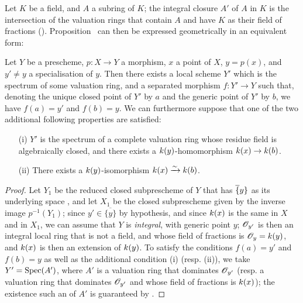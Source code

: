 \begin{env}[7.1.3]
\label{II.7.1.3}
Let $K$ be a field, and $A$ a subring of $K$;
the integral closure $A'$ of $A$ in $K$ is the intersection of the valuation rings that contain $A$ and have $K$ as their field of fractions (\cite[p.~51, th.~2]{I-11}).
Proposition~ can then be expressed geometrically in an equivalent form:
\end{env}

\begin{proposition}[7.1.4]
\label{II.7.1.4}
Let $Y$ be a prescheme, $p:X\to Y$ a morphism, $x$ a point of $X$, $y=p(x)$, and $y'\neq y$ a specialisation  of $y$.
Then there exists a local scheme $Y'$ which is the spectrum of some valuation ring, and a separated morphism $f:Y'\to Y$ such that, denoting the unique closed point of $Y'$ by $a$ and the generic point of $Y'$ by $b$, we have $f(a)=y'$ and $f(b)=y$.
We can furthermore suppose that one of the two additional following properties are satisfied:
\begin{enumerate}
    \item[\rm{(i)}] $Y'$ is the spectrum of a complete valuation ring whose residue field is algebraically closed, and there exists a $k(y)$-homomorphism $\kres(x)\to\kres(b)$.
    \item[\rm{(ii)}] There exists a $k(y)$-isomorphism $k(x)\xrightarrow{\sim}k(b)$.
\end{enumerate}
\end{proposition}

\begin{proof}
\label{proof-II.7.1.4}
Let $Y_1$ be the reduced closed subprescheme of $Y$ that has $\overline\{y\}$ as its underlying space , and let $X_1$ be the closed subprescheme given by the inverse image $p^{-1}(Y_1)$;
since $y'\in\overline{\{y\}}$ by hypothesis, and since $k(x)$ is the same in $X$ and in $X_1$, we can assume that $Y$ is \emph{integral}, with generic point $y$;
$\mathscr{O}_{y'}$ is then an integral local ring that is not a field, and whose field of fractions is $\mathscr{O}_y=k(y)$, and $k(x)$ is then an extension of $k(y)$.
To satisfy the conditions $f(a)=y'$ and $f(b)=y$ as well as the additional condition (i) (resp. (ii)), we take $Y'=\operatorname{Spec}(A')$, where $A'$ is a valuation ring that dominates $\mathscr{O}_{y'}$ (resp. a valuation ring that dominates $\mathscr{O}_{y'}$ and whose field of fractions is $k(x)$);
the existence such an of $A'$ is guaranteed by .
\end{proof}

